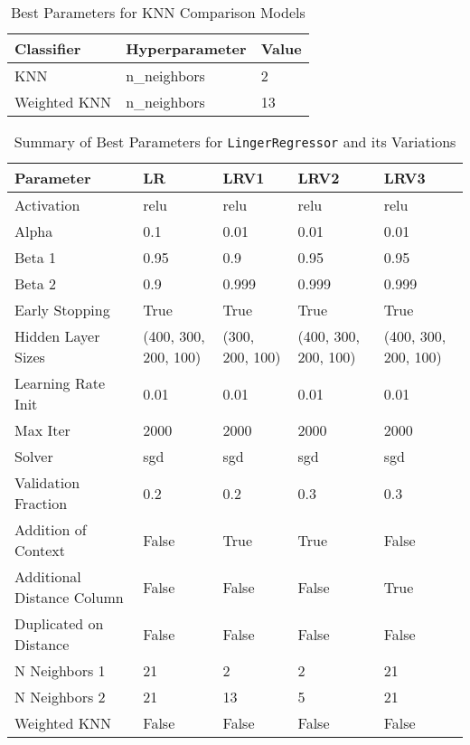 \documentclass[a4paper, 12pt]{report}
\begin{document}
\begin{table}[H]
    \centering
    \caption{Best Parameters for KNN Comparison Models}
    \label{tab:best_parameters_combined_knn_exp2}
    \begin{tabular}{|l|l|l|}
    \toprule
    \textbf{Classifier} & \textbf{Hyperparameter} & \textbf{Value} \\
    \midrule
    KNN & n\_neighbors & 2 \\
    Weighted KNN & n\_neighbors & 13 \\
    \bottomrule
\end{tabular}
\end{table}

\begin{table}[h]
    \centering
    \caption{Summary of Best Parameters for \texttt{LingerRegressor} and its Variations}
    \label{tab:best_parameters_summary_exp6}
    \footnotesize
    \begin{tabular}{|l|l|l|l|l|}
    \hline
    Parameter & LR & LRV1 & LRV2 & LRV3 \\
    \hline
    Activation & relu & relu & relu & relu \\
    Alpha & 0.1 & 0.01 & 0.01 & 0.01 \\
    Beta 1 & 0.95 & 0.9 & 0.95 & 0.95 \\
    Beta 2 & 0.9 & 0.999 & 0.999 & 0.999 \\
    Early Stopping & True & True & True & True \\
    Hidden Layer Sizes & (400, 300, 200, 100) & (300, 200, 100) & (400, 300, 200, 100) & (400, 300, 200, 100) \\
    Learning Rate Init & 0.01 & 0.01 & 0.01 & 0.01 \\
    Max Iter & 2000 & 2000 & 2000 & 2000 \\
    Solver & sgd & sgd & sgd & sgd \\
    Validation Fraction & 0.2 & 0.2 & 0.3 & 0.3 \\
    Addition of Context & False & True & True & False \\
    Additional Distance Column & False & False & False & True \\
    Duplicated on Distance & False & False & False & False \\
    N Neighbors 1 & 21 & 2 & 2 & 21 \\
    N Neighbors 2 & 21 & 13 & 5 & 21 \\
    Weighted KNN & False & False & False & False \\
    \hline
    \end{tabular}
\end{table}
\clearpage
\end{document}
